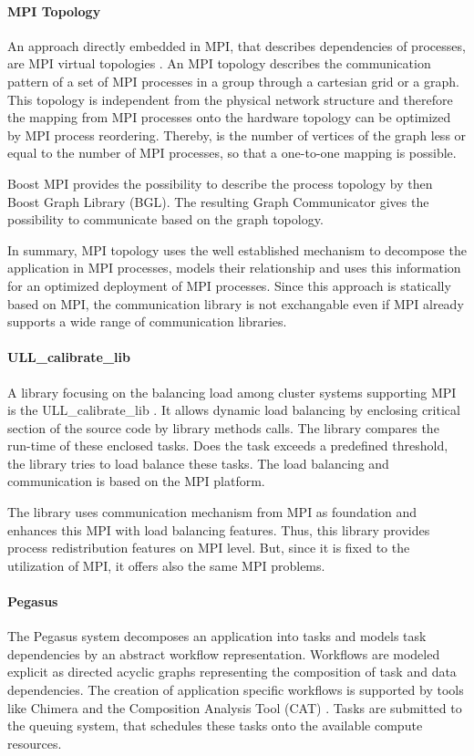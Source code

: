 \paragraph*{MPI Topology}
An approach directly embedded in MPI, that describes dependencies of
processes, are MPI virtual topologies \cite{ref:mpi_topology}. An MPI
topology describes the communication pattern of a set of MPI processes
in a group through a cartesian grid or a graph.  This topology is
independent from the physical network structure and therefore the
mapping from MPI processes onto the hardware topology can be optimized
by MPI process reordering. Thereby, is the number of vertices of the
graph less or equal to the number of MPI processes, so that a
one-to-one mapping is possible.

Boost MPI provides the possibility to describe the process topology by
then Boost Graph Library (BGL)\cite{ref:boost_bgl}.  The resulting
Graph Communicator \cite{ref:boost_graph_communicator} gives the
possibility to communicate based on the graph topology.

In summary, MPI topology uses the well established mechanism to
decompose the application in MPI processes, models their relationship
and uses this information for an optimized deployment of MPI processes.
Since this approach is statically based on MPI, the communication
library is not exchangable even if MPI already supports a wide range
of communication libraries.

\paragraph*{ULL\_calibrate\_lib}
A library focusing on the balancing load among cluster systems
supporting MPI is the ULL\_calibrate\_lib
\cite{ref:ull_calibrate_lib}. It allows dynamic load balancing by
enclosing critical section of the source code by library methods
calls. The library compares the run-time of these enclosed tasks. Does
the task exceeds a predefined threshold, the library tries to
load balance these tasks. The load balancing and communication is based on
the MPI platform.

The library uses communication mechanism from MPI as foundation and
enhances this MPI with load balancing features. Thus, this library
provides process redistribution features on MPI level. But, since it
is fixed to the utilization of MPI, it offers also the same MPI
problems.

\paragraph*{Pegasus}
The Pegasus system \cite{ref:pegasus} decomposes an application into
tasks and models task dependencies by an abstract workflow
representation. Workflows are modeled explicit as directed acyclic
graphs representing the composition of task and data dependencies. The
creation of application specific workflows is supported by tools like
Chimera \cite{ref:chimera} and the Composition Analysis Tool (CAT)
\cite{ref:cat}.  Tasks are submitted to the queuing system, that
schedules these tasks onto the available compute resources.

